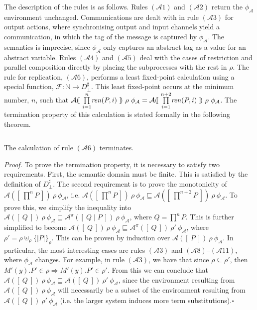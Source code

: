 \documentclass{entcs} \usepackage{entcsmacro}
\begin{document}
\noindent
The description of the rules is as follows.  Rules $(\mathcal{A}1)$ and $(\mathcal{A}2)$ return the $\phi_\mathcal{A}$ environment unchanged.  Communications are dealt with in rule $(\mathcal{A}3)$ for output actions, where synchronising output and input channels yield a communication, in which the tag of the message is captured by $\phi_\mathcal{A}$. The semantics is imprecise, since $\phi_\mathcal{A}$ only captures an abstract tag as a value for an abstract variable.  Rules $(\mathcal{A}4)$ and $(\mathcal{A}5)$ deal with the cases of restriction and parallel composition directly by placing the subprocesses with the rest in $\rho$.  The rule for replication, $(\mathcal{A}6)$, performs a least fixed-point calculation using a special function, $\mathcal{F}:\mathbb{N}\to D^\sharp_\bot$.  This least fixed-point occurs at the minimum number, $n$, such that $\mathcal{A}(\![~\underset{i=1}{\overset{n}{\prod}}\mbox{{\itshape ren\/}}(P,i)~]\!)~\rho~\phi_\mathcal{A}=\mathcal{A}(\![~\underset{i=1}{\overset{n+2}{\prod}}\mbox{{\itshape ren\/}}(P,i)~]\!)~\rho~\phi_\mathcal{A}$.  The termination property of this calculation is stated formally in the following theorem.
\begin{theor}
$ $

\noindent
The calculation of rule $(\mathcal{A}6)$ terminates.
\end{theor}
{\itshape Proof.\/} To prove the termination property, it is necessary to satisfy two requirements.  First, the semantic domain must be finite. This is satisfied by the definition of $D^\sharp_\bot$. The second requirement is to prove the monotonicity of $\mathcal{A}(\![~\overset{n}{\prod}P~]\!)~\rho~\phi_\mathcal{A}$, i.e. $\mathcal{A}(\![~\overset{n}{\prod}P~]\!)~\rho~\phi_\mathcal{A}\sqsubseteq\mathcal{A}(\![~\overset{n+2}{\prod}P~]\!)~\rho~\phi_\mathcal{A}$.  To prove this, we simplify the inequality into $\mathcal{A}(\![~Q~]\!)~\rho~\phi_\mathcal{A}\sqsubseteq\mathcal{A}^\pi(\![~Q\mid P~]\!)~\rho~\phi_\mathcal{A}$, where $Q=\overset{n}{\prod}P$. This is further simplified to become $\mathcal{A}(\![~Q~]\!)~\rho~\phi_\mathcal{A}\sqsubseteq\mathcal{A}^\pi(\![~Q~]\!)~\rho'~\phi_\mathcal{A}$, where $\rho'=\rho\uplus_\rho\{\!|P|\!\}_\rho$. This can be proven by induction over $\mathcal{A}(\![~P~]\!)~\rho~\phi_\mathcal{A}$. In particular, the most interesting cases are rules $(\mathcal{A} 3)$ and $(\mathcal{A} 8)$--$(\mathcal{A} 11)$, where $\phi_\mathcal{A}$ changes.  For example, in rule $(\mathcal{A} 3)$, we have that since $\rho\subseteq\rho'$, then $M'(y).P'\in\rho\Rightarrow M'(y).P'\in\rho'$. From this we can conclude that $\mathcal{A}(\![~Q~]\!)~\rho~\phi_\mathcal{A}\sqsubseteq\mathcal{A}(\![~Q~]\!)~\rho'~\phi_\mathcal{A}$, since the environment resulting from $\mathcal{A}(\![~Q~]\!)~\rho~\phi_\mathcal{A}$ will necessarily be a subset of the environment resulting from $\mathcal{A}(\![~Q~]\!)~\rho'~\phi_\mathcal{A}$ (i.e. the larger system induces more term substitutions).\hfill$\square$\\
\end{document}
